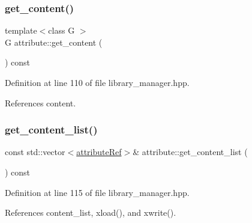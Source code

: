\subsubsection{\texorpdfstring{get\+\_\+content()}{get\_content()}}
{\footnotesize\ttfamily template$<$class G $>$ \\
G attribute\+::get\+\_\+content (\begin{DoxyParamCaption}{ }\end{DoxyParamCaption}) const\hspace{0.3cm}{\ttfamily [inline]}}



Definition at line 110 of file library\+\_\+manager.\+hpp.



References content.

\mbox{\label{structattribute_a48846ecae25fc8c990c01ba21de1ba7b}} 
\subsubsection{\texorpdfstring{get\+\_\+content\+\_\+list()}{get\_content\_list()}}
{\footnotesize\ttfamily const std\+::vector$<$\hyperlink{library__manager_8hpp_a46399d2eacc03fb10f84fb33987ab8e3}{attribute\+Ref}$>$\& attribute\+::get\+\_\+content\+\_\+list (\begin{DoxyParamCaption}{ }\end{DoxyParamCaption}) const\hspace{0.3cm}{\ttfamily [inline]}}



Definition at line 115 of file library\+\_\+manager.\+hpp.



References content\+\_\+list, xload(), and xwrite().

